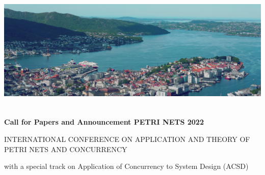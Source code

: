 \documentclass[10pt]{article}
\begin{document}
\begin{center}
\includegraphics[width=\textwidth,height=6cm]{images/bergen.jpg}
\end{center}

\begin{center}
{\large\bf
Call for Papers and Announcement PETRI NETS 2022

\smallskip

 INTERNATIONAL CONFERENCE ON APPLICATION AND THEORY OF \\ PETRI NETS AND CONCURRENCY

\smallskip

with a special track on Application of Concurrency to System Design (ACSD)}
\end{center}
\end{document}
